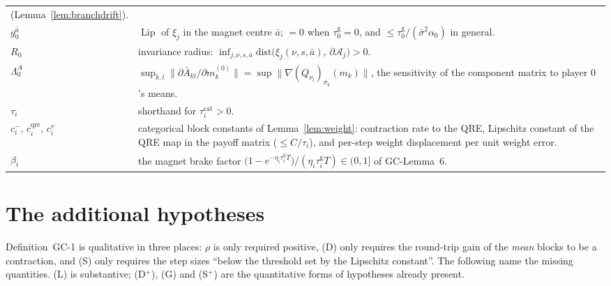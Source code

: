 \documentclass[11pt]{article}
\theoremstyle{definition}
\newcommand{\cA}{\mathcal{A}}
\newcommand{\Lip}{\operatorname{Lip}}
\newcommand{\GC}[1]{\textsf{GC-#1}}
\begin{document}
\begin{center}
\begin{tabular}{@{}l p{}@{}}
  (Lemma~\ref{lem:branchdrift}).\\
$g^{\bar a}_0$ & $\Lip$ of $\xi_j$ in the magnet centre $\bar a$; $= 0$ when
  $\tau^{\mathrm g}_0 = 0$, and $\le \tau^{\mathrm g}_0/
  (\bar\sigma^2\alpha_0)$ in general.\\
$R_0$ & invariance radius: $\inf_{j,\nu,s,\bar a}
  \mathrm{dist}\big(\xi_j(\nu,s,\bar a),\, \partial\cA_j\big) > 0$.\\
$\Lambda^{A}_0$ & $\sup_{k,l}\|\partial \bar A_{kl}/\partial m^{(0)}_k\|
  = \sup \|\nabla (Q_{\nu_l})_{\sigma_k}(m_k)\|$, the sensitivity of the
  component matrix to player $0$'s means.\\
$\tau_i$ & shorthand for $\tau^{\mathrm{cat}}_i > 0$.\\
$c^-_i,\, c^{\mathrm{qre}}_i,\, c^v_i$ & categorical block constants of
  Lemma~\ref{lem:weight}: contraction rate to the QRE, Lipschitz constant of the
  QRE map in the payoff matrix ($\le C/\tau_i$), and per-step weight displacement
  per unit weight error.\\
$\beta_i$ & the magnet brake factor $\big(1 - e^{-\eta_i\tau^{\mathrm g}_iT}\big)/
  (\eta_i\tau^{\mathrm g}_iT) \in (0,1]$ of \GC{Lemma~6}.\\
\hline
\end{tabular}
\end{center}

\section{The additional hypotheses}\label{sec:hyp}

Definition~\GC{1} is qualitative in three places: $\rho$ is only required
positive, (D) only requires the round-trip gain of the \emph{mean} blocks to be a
contraction, and (S) only requires the step sizes ``below the threshold set by
the Lipschitz constant''. The following name the missing quantities. (L) is
substantive; (D$^+$), (G) and (S$^+$) are the quantitative forms of hypotheses
already present.
\end{document}
